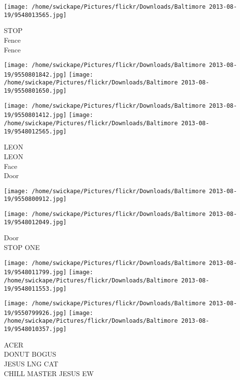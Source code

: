\documentclass[10pt,letterpaper]{article}
\begin{document}
\vspace{0.25in}
\texttt{[image: /home/swickape/Pictures/flickr/Downloads/Baltimore 2013-08-19/9548013565.jpg]}

STOP\\
Fence\\
Fence\\
\pagebreak

\texttt{[image: /home/swickape/Pictures/flickr/Downloads/Baltimore 2013-08-19/9550801842.jpg]}
\texttt{[image: /home/swickape/Pictures/flickr/Downloads/Baltimore 2013-08-19/9550801650.jpg]}

\texttt{[image: /home/swickape/Pictures/flickr/Downloads/Baltimore 2013-08-19/9550801412.jpg]}
\texttt{[image: /home/swickape/Pictures/flickr/Downloads/Baltimore 2013-08-19/9548012565.jpg]}

LEON\\
LEON\\
Face\\
Door\\
\pagebreak

\texttt{[image: /home/swickape/Pictures/flickr/Downloads/Baltimore 2013-08-19/9550800912.jpg]}

\vspace{0.25in}
\texttt{[image: /home/swickape/Pictures/flickr/Downloads/Baltimore 2013-08-19/9548012049.jpg]}

Door\\
STOP ONE\\
\pagebreak

\texttt{[image: /home/swickape/Pictures/flickr/Downloads/Baltimore 2013-08-19/9548011799.jpg]}
\texttt{[image: /home/swickape/Pictures/flickr/Downloads/Baltimore 2013-08-19/9548011553.jpg]}

\texttt{[image: /home/swickape/Pictures/flickr/Downloads/Baltimore 2013-08-19/9550799926.jpg]}
\texttt{[image: /home/swickape/Pictures/flickr/Downloads/Baltimore 2013-08-19/9548010357.jpg]}

ACER\\
DONUT BOGUS\\
JESUS LNG CAT\\
CHILL MASTER JESUS EW\\
\pagebreak
\end{document}
